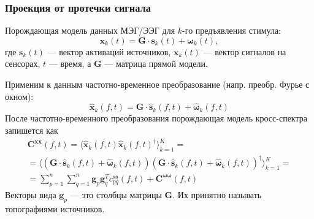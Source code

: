 \documentclass[12pt]{beamer}
\newcommand{\Cp}[1]{\mathbf{C}^{\mathbf{#1 #1}}} %
\begin{document}


\begin{frame}[t]
    \frametitle{Проекция от протечки сигнала}
    
{\tiny Порождающая модель данных МЭГ/ЭЭГ для $k$-го предъявления стимула:}
\begin{equation}
    \scriptstyle
    \mathbf{x}_k(t) = \mathbf{G} \cdot \mathbf{s}_k(t) + \mathbf{\omega}_k(t),
    \label{gm_ts}
\end{equation}
{\tiny где $\mathbf{s}_k(t)$ ---  вектор активаций источников,
$\mathbf{x}_k(t)$ --- вектор сигналов на сенсорах,
$t$ --- время, а $\mathbf{G}$ --- матрица прямой модели.}

{\tiny Применим к данным частотно-временное преобразование (напр. преобр. Фурье с окном):}
\begin{equation}
    \scriptstyle
    \hat{\mathbf{x}}_k(f, t) = \mathbf{G} \cdot \hat{\mathbf{s}}_k(f, t) + \hat{\mathbf{\omega}}_k(f, t)
    \label{gm_timefreq_no_fi}
\end{equation}
{\tiny После частотно-временного преобразования порождающая модель кросс-спектра запишется как}
\begin{gather*}
    \scriptstyle
      \Cp{x}(f, t)  =  \langle{\hat{\mathbf{x}}_k(f, t) \hat{\mathbf{x}}_k(f, t)^{\dag}} \rangle_{k=1}^K =\\
    \scriptstyle
      = \langle{(\mathbf{G} \cdot\hat{\mathbf{s}}_k(f, t) + \hat{\mathbf{\omega}}_k(f, t))
                                       (\mathbf{G} \cdot\hat{\mathbf{s}}_k(f, t) + \hat{\mathbf{\omega}}_k(f, t))^{\dag}}\rangle_{k=1}^K=\nonumber\\
    \scriptstyle
     = \sum\limits_{p=1}^n\sum\limits_{q=1}^n\mathbf{g}_p\mathbf{g}_q^T c_{pq}^{\mathbf{ss}}(f, t) + \Cp{\omega}(f, t)
    \label{gm_cp_ini}
\end{gather*}
     {\tiny Векторы вида $\mathbf{g}_p$ --- это столбцы матрицы $\mathbf{G}$. Их принятно называть топографиями источников.}
\end{frame}
\end{document}
